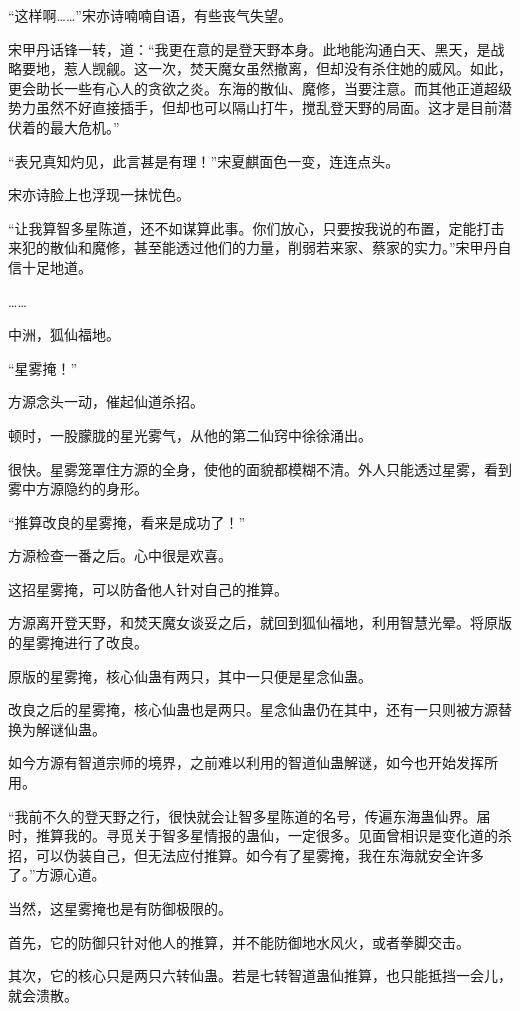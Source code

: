 \begin{this_body}
“这样啊……”宋亦诗喃喃自语，有些丧气失望。

宋甲丹话锋一转，道：“我更在意的是登天野本身。此地能沟通白天、黑天，是战略要地，惹人觊觎。这一次，焚天魔女虽然撤离，但却没有杀住她的威风。如此，更会助长一些有心人的贪欲之炎。东海的散仙、魔修，当要注意。而其他正道超级势力虽然不好直接插手，但却也可以隔山打牛，搅乱登天野的局面。这才是目前潜伏着的最大危机。”

“表兄真知灼见，此言甚是有理！”宋夏麒面色一变，连连点头。

宋亦诗脸上也浮现一抹忧色。

“让我算智多星陈道，还不如谋算此事。你们放心，只要按我说的布置，定能打击来犯的散仙和魔修，甚至能透过他们的力量，削弱若来家、蔡家的实力。”宋甲丹自信十足地道。

……

中洲，狐仙福地。

“星雾掩！”

方源念头一动，催起仙道杀招。

顿时，一股朦胧的星光雾气，从他的第二仙窍中徐徐涌出。

很快。星雾笼罩住方源的全身，使他的面貌都模糊不清。外人只能透过星雾，看到雾中方源隐约的身形。

“推算改良的星雾掩，看来是成功了！”

方源检查一番之后。心中很是欢喜。

这招星雾掩，可以防备他人针对自己的推算。

方源离开登天野，和焚天魔女谈妥之后，就回到狐仙福地，利用智慧光晕。将原版的星雾掩进行了改良。

原版的星雾掩，核心仙蛊有两只，其中一只便是星念仙蛊。

改良之后的星雾掩，核心仙蛊也是两只。星念仙蛊仍在其中，还有一只则被方源替换为解谜仙蛊。

如今方源有智道宗师的境界，之前难以利用的智道仙蛊解谜，如今也开始发挥所用。

“我前不久的登天野之行，很快就会让智多星陈道的名号，传遍东海蛊仙界。届时，推算我的。寻觅关于智多星情报的蛊仙，一定很多。见面曾相识是变化道的杀招，可以伪装自己，但无法应付推算。如今有了星雾掩，我在东海就安全许多了。”方源心道。

当然，这星雾掩也是有防御极限的。

首先，它的防御只针对他人的推算，并不能防御地水风火，或者拳脚交击。

其次，它的核心只是两只六转仙蛊。若是七转智道蛊仙推算，也只能抵挡一会儿，就会溃散。


\end{this_body}

